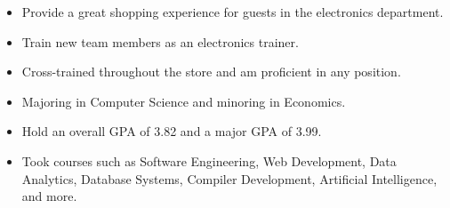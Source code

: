 \documentclass[10pt,a4paper]{altacv}
\begin{document}
\divider

\begin{itemize}
\item Provide a great shopping experience for guests in the electronics department.
\item Train new team members as an electronics trainer.
\item Cross-trained throughout the store and am proficient in any position.
\end{itemize}


\begin{itemize}
\item Majoring in Computer Science and minoring in Economics.
\item Hold an overall GPA of 3.82 and a major GPA of 3.99.
\item Took courses such as Software Engineering, Web Development, Data Analytics, Database Systems, Compiler Development, Artificial Intelligence, and more.
\end{itemize}
\medskip
\end{document}

